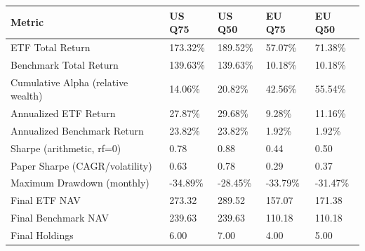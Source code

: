 \begin{longtable}{lllll}
Metric & US Q75 & US Q50 & EU Q75 & EU Q50 \\
\hline
ETF Total Return & 173.32\% & 189.52\% & 57.07\% & 71.38\% \\
Benchmark Total Return & 139.63\% & 139.63\% & 10.18\% & 10.18\% \\
Cumulative Alpha (relative wealth) & 14.06\% & 20.82\% & 42.56\% & 55.54\% \\
Annualized ETF Return & 27.87\% & 29.68\% & 9.28\% & 11.16\% \\
Annualized Benchmark Return & 23.82\% & 23.82\% & 1.92\% & 1.92\% \\
Sharpe (arithmetic, rf=0) & 0.78 & 0.88 & 0.44 & 0.50 \\
Paper Sharpe (CAGR/volatility) & 0.63 & 0.78 & 0.29 & 0.37 \\
Maximum Drawdown (monthly) & -34.89\% & -28.45\% & -33.79\% & -31.47\% \\
Final ETF NAV & 273.32 & 289.52 & 157.07 & 171.38 \\
Final Benchmark NAV & 239.63 & 239.63 & 110.18 & 110.18 \\
Final Holdings & 6.00 & 7.00 & 4.00 & 5.00 \\
\end{longtable}
